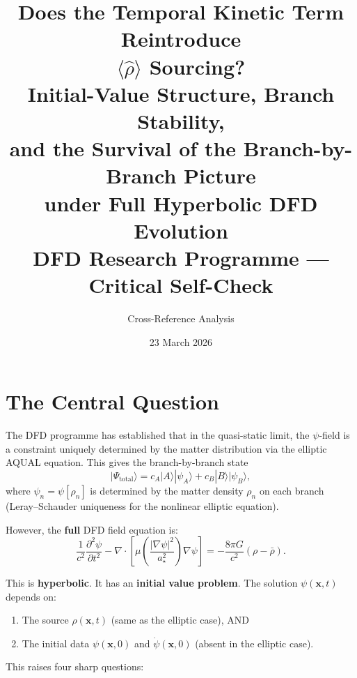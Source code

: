 \documentclass[12pt,a4paper]{article}
\title{Does the Temporal Kinetic Term Reintroduce\\
$\langle\hat\rho\rangle$ Sourcing?\\[6pt]
\large Initial-Value Structure, Branch Stability,\\
and the Survival of the Branch-by-Branch Picture\\
under Full Hyperbolic DFD Evolution\\[6pt]
\normalsize DFD Research Programme --- Critical Self-Check}
\author{Cross-Reference Analysis}
\date{23 March 2026}
\begin{document}
\maketitle
\tableofcontents
\newpage

\section{The Central Question}
\label{sec:question}

The DFD programme has established that in the quasi-static limit, the
$\psi$-field is a constraint uniquely determined by the matter
distribution via the elliptic AQUAL equation. This gives the
branch-by-branch state
\begin{equation}\label{eq:branch-state}
|\Psi_\mathrm{total}\rangle = c_A|A\rangle|\psi_A\rangle
+ c_B|B\rangle|\psi_B\rangle,
\end{equation}
where $\psi_n = \psi[\rho_n]$ is determined by the matter density
$\rho_n$ on each branch (Leray--Schauder uniqueness for the nonlinear
elliptic equation).

However, the \textbf{full} DFD field equation is:
\begin{equation}\label{eq:full-dfd}
\frac{1}{c^2}\frac{\partial^2\psi}{\partial t^2}
- \nabla\cdot\!\left[\mu\!\left(\frac{|\nabla\psi|^2}{a_\star^2}\right)
\nabla\psi\right]
= -\frac{8\pi G}{c^2}(\rho - \bar\rho).
\end{equation}

This is \textbf{hyperbolic}. It has an \textbf{initial value problem}.
The solution $\psi(\mathbf{x},t)$ depends on:
\begin{enumerate}
\item The source $\rho(\mathbf{x},t)$ (same as the elliptic case), AND
\item The initial data $\psi(\mathbf{x},0)$ and
      $\dot\psi(\mathbf{x},0)$ (absent in the elliptic case).
\end{enumerate}

This raises four sharp questions:
\end{document}
